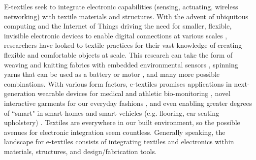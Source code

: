 E-textiles seek to integrate electronic capabilities (sensing, actuating, wireless networking) with textile materials and structures. With the advent of ubiquitous computing and the Internet of Things driving the need for smaller, flexible, invisible electronic devices to enable digital connections at various scales \cite{fernandez-carames_towards_2018}, researchers have looked to textile practices for their vast knowledge of creating flexible and comfortable objects at scale. This research can take the form of weaving and knitting fabrics with embedded environmental sensors \cite{afroj_engineering_2019,kim_wearair:_2010}, spinning yarns that can be used as a battery or motor \cite{lund_roll--roll_2018,rathnayake_yarns_2015,li_wearable_2016}, and many more possible combinations. With various form factors, e-textiles promises applications in next-generation wearable devices for medical and athletic bio-monitoring \cite{motti_wearable_2019,patron_use_2016}, novel interactive garments for our everyday fashions \cite{mironcika_snap-snap_2020,berzowska_skorpions_2008,klamka_watchstrap_2020}, and even enabling greater degrees of ``smart" in smart homes and smart vehicles (e.g. flooring, car seating upholstery) \cite{karimi_systems_2018,ruckdashel_smart_2021}. Textiles are everywhere in our built environment, so the possible avenues for electronic integration seem countless. Generally speaking, the landscape for e-textiles consists of integrating textiles and electronics within materials, structures, and design/fabrication tools.


